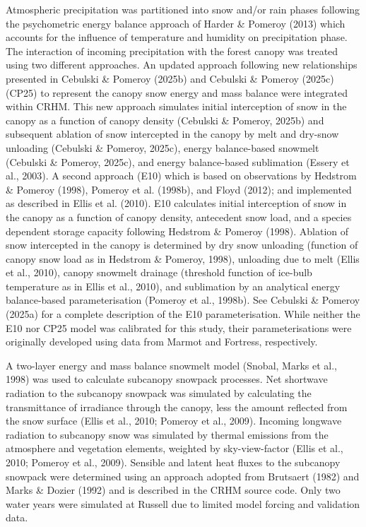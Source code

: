 \documentclass[
  letterpaper,
]{tex/uofsthesis-cs}
\begin{document}
Atmospheric precipitation was partitioned into snow and/or rain phases
following the psychometric energy balance approach of Harder \& Pomeroy
(2013) which accounts for the influence of temperature and humidity on
precipitation phase. The interaction of incoming precipitation with the
forest canopy was treated using two different approaches. An updated
approach following new relationships presented in Cebulski \& Pomeroy
(2025b) and Cebulski \& Pomeroy (2025c) (CP25) to represent the canopy
snow energy and mass balance were integrated within CRHM. This new
approach simulates initial interception of snow in the canopy as a
function of canopy density (Cebulski \& Pomeroy, 2025b) and subsequent
ablation of snow intercepted in the canopy by melt and dry-snow
unloading (Cebulski \& Pomeroy, 2025c), energy balance-based snowmelt
(Cebulski \& Pomeroy, 2025c), and energy balance-based sublimation
(Essery et al., 2003). A second approach (E10) which is based on
observations by Hedstrom \& Pomeroy (1998), Pomeroy et al. (1998b), and
Floyd (2012); and implemented as described in Ellis et al. (2010). E10
calculates initial interception of snow in the canopy as a function of
canopy density, antecedent snow load, and a species dependent storage
capacity following Hedstrom \& Pomeroy (1998). Ablation of snow
intercepted in the canopy is determined by dry snow unloading (function
of canopy snow load as in Hedstrom \& Pomeroy, 1998), unloading due to
melt (Ellis et al., 2010), canopy snowmelt drainage (threshold function
of ice-bulb temperature as in Ellis et al., 2010), and sublimation by an
analytical energy balance-based parameterisation (Pomeroy et al.,
1998b). See Cebulski \& Pomeroy (2025a) for a complete description of
the E10 parameterisation. While neither the E10 nor CP25 model was
calibrated for this study, their parameterisations were originally
developed using data from Marmot and Fortress, respectively.

A two-layer energy and mass balance snowmelt model (Snobal, Marks et
al., 1998) was used to calculate subcanopy snowpack processes. Net
shortwave radiation to the subcanopy snowpack was simulated by
calculating the transmittance of irradiance through the canopy, less the
amount reflected from the snow surface (Ellis et al., 2010; Pomeroy et
al., 2009). Incoming longwave radiation to subcanopy snow was simulated
by thermal emissions from the atmosphere and vegetation elements,
weighted by sky-view-factor (Ellis et al., 2010; Pomeroy et al., 2009).
Sensible and latent heat fluxes to the subcanopy snowpack were
determined using an approach adopted from Brutsaert (1982) and Marks \&
Dozier (1992) and is described in the CRHM source code. Only two water
years were simulated at Russell due to limited model forcing and
validation data.
\end{document}
